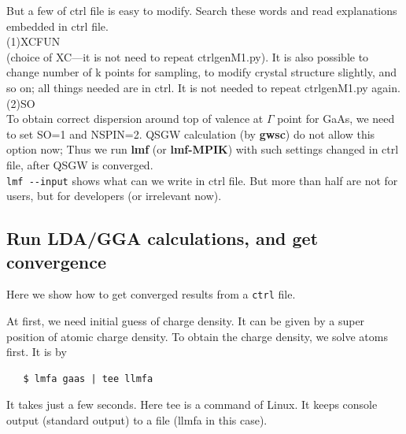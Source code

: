 \documentclass[a4paper,10pt,epsf,fleqn]{article}
\newcommand{\exe}[1]{{\bf #1}}
\begin{document}
But a few of ctrl file is easy to modify. Search these words and read 
explanations embedded in ctrl file.\\
(1)XCFUN \\
(choice of XC---it is not need to repeat ctrlgenM1.py). 
It is also possible to change number of k points for sampling, to modify
crystal structure slightly, and so on; all things needed are in ctrl.
It is not needed to repeat ctrlgenM1.py again.\\
(2)SO \\
To obtain correct dispersion around top of valence at 
$\Gamma$ point for GaAs, we need to set SO=1 and NSPIN=2. 
QSGW calculation (by \exe{gwsc}) do not allow this option now;
Thus we run \exe{lmf} (or \exe{lmf-MPIK})
with such settings changed in ctrl file, after QSGW is converged.\\

\verb+lmf --input+ shows what can we write in ctrl file.
But more than half are not for users, but for developers 
(or irrelevant now).
 

\subsection{Run LDA/GGA calculations, and get convergence}
\label{lm7K-scf}
Here we show how to get converged results from a \verb+ctrl+ file.

At first, we need initial guess of charge density.
It can be given by a super position of atomic charge density.
To obtain the charge density, we solve atoms first. It is by
\begin{verbatim}
   $ lmfa gaas | tee llmfa
\end{verbatim}
It takes just a few seconds. Here tee is a command of Linux.
It keeps console output (standard output) to a file (llmfa in this case).
\end{document}
